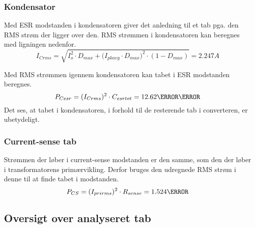 \subsubsection{Kondensator}
Med ESR modstanden i kondensatoren giver det anledning til et tab pga. den RMS strøm der ligger over den. RMS strømmen i kondensatoren kan beregnes med ligningen nedenfor\cite[p.~3]{RMS-current}. 
\begin{equation} \label{kondensatorrms}
I_{C rms} = \sqrt{I_o^{2}\cdot D_{max}+(I_{pkavg}\cdot {D_{max})}^{2}\cdot (1-D_{max})} = 2.247A
\end{equation}  

Med RMS strømmen igennem kondensatoren kan tabet i ESR modstanden beregnes.
\begin{equation} \label{eq:kondensatortab}
P_{Cesr} = (I_{C rms})^2 \cdot C_{esrtot} = 12.62\milli\watt
\end{equation}
Det ses, at tabet i kondensatoren, i forhold til de resterende tab i converteren, er ubetydeligt. 


\subsubsection{Current-sense tab}
Strømmen der løber i current-sense modstanden er den samme, som den der løber i transformatorens primærvikling. Derfor bruges den udregnede RMS strøm i denne til at finde tabet i modstanden. 
\begin{equation} \label{kondensatortab}
P_{CS} = (I_{prirms})^2 \cdot R_{sense} = 1.524\watt
\end{equation}

\subsection{Oversigt over analyseret tab}

